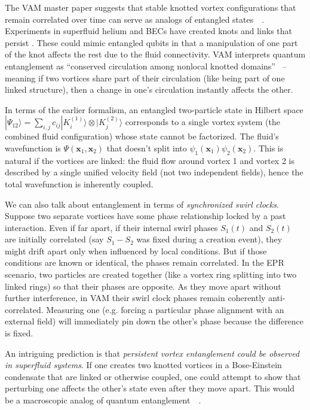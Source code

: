 \documentclass[preprint]{revtex4-2}
\begin{document}
    The VAM master paper suggests that stable knotted vortex configurations that remain correlated over time can serve as analogs of entangled states~\cite{reference_104}~\cite{reference_105}. Experiments in superfluid helium and BECs have created knots and links that persist \cite{Irvine2013-knots}. These could mimic entangled qubits in that a manipulation of one part of the knot affects the rest due to the fluid connectivity. VAM interprets quantum entanglement as “conserved circulation among nonlocal knotted domains”~\cite{reference_106} – meaning if two vortices share part of their circulation (like being part of one linked structure), then a change in one’s circulation instantly affects the other.

    In terms of the earlier formalism, an entangled two-particle state in Hilbert space $|\Psi_{12}\rangle = \sum_{i,j} c_{ij} |K_i^{(1)}\rangle\otimes|K_j^{(2)}\rangle$ corresponds to a single vortex system (the combined fluid configuration) whose state cannot be factorized. The fluid’s wavefunction is $\Psi(\mathbf{x}_1, \mathbf{x}_2)$ that doesn’t split into $\psi_1(\mathbf{x}_1)\psi_2(\mathbf{x}_2)$. This is natural if the vortices are linked: the fluid flow around vortex 1 and vortex 2 is described by a single unified velocity field (not two independent fields), hence the total wavefunction is inherently coupled.

    We can also talk about entanglement in terms of \emph{synchronized swirl clocks}. Suppose two separate vortices have some phase relationship locked by a past interaction. Even if far apart, if their internal swirl phases $S_1(t)$ and $S_2(t)$ are initially correlated (say $S_1 - S_2$ was fixed during a creation event), they might drift apart only when influenced by local conditions. But if those conditions are known or identical, the phases remain correlated. In the EPR scenario, two particles are created together (like a vortex ring splitting into two linked rings) so that their phases are opposite. As they move apart without further interference, in VAM their swirl clock phases remain coherently anti-correlated. Measuring one (e.g. forcing a particular phase alignment with an external field) will immediately pin down the other’s phase because the difference is fixed.

    An intriguing prediction is that \emph{persistent vortex entanglement could be observed in superfluid systems}. If one creates two knotted vortices in a Bose-Einstein condensate that are linked or otherwise coupled, one could attempt to show that perturbing one affects the other’s state even after they move apart. This would be a macroscopic analog of quantum entanglement~\cite{reference_107}~\cite{reference_108}.
\end{document}
